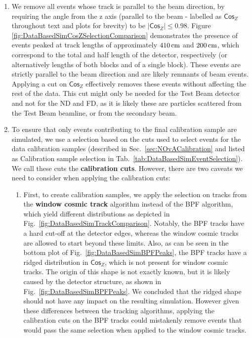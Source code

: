 \begin{enumerate}
\item We remove all events whose track is parallel to the beam direction, by requiring the angle from the z axis (parallel to the beam - labelled as $\textsf{Cos}_Z$ throughout text and plots for brevity) to be $|\textsf{Cos}_Z|\leq 0.98$. Figure \ref{fig:DataBasedSimCosZSelectionComparison} demonstrates the presence of events peaked at track lengths of approximately $\unit[410]{cm}$ and $\unit[200]{cm}$, which correspond to the total and half length of the detector, respectively (or alternatively lengths of both blocks and of a single block). These events are strictly parallel to the beam direction and are likely remnants of beam events. Applying a cut on $\textsf{Cos}_Z$ effectively removes these events without affecting the rest of the data. This cut might only be needed for the Test Beam detector and not for the \gls{ND} and \gls{FD}, as it is likely these are particles scattered from the Test Beam beamline, or from the secondary beam.

\item To ensure that only events contributing to the final calibration sample are simulated, we use a selection based on the cuts used to select events for the data calibration samples (described in Sec.~\ref{sec:NOvACalibration} and listed as Calibration sample selection in Tab.~\ref{tab:DataBasedSimEventSelection}). We call these cuts the \textbf{calibration cuts}. However, there are two caveats we need to consider when applying the calibration cuts:
\begin{enumerate}
\item First, to create calibration samples, we apply the selection on tracks from the \textbf{window cosmic track} algorithm instead of the \gls{BPF} algorithm, which yield different distributions as depicted in Fig.~\ref{fig:DataBasedSimTrackComparison}. Notably, the \gls{BPF} tracks have a hard cut-off at the detector edges, whereas the window cosmic tracks are allowed to start beyond these limits. Also, as can be seen in the bottom plot of Fig.~\ref{fig:DataBasedSimBPFPeaks}, the \gls{BPF} tracks have a ridged distribution in $\textsf{Cos}_Z$, which is not present for window cosmic tracks. The origin of this shape is not exactly known, but it is likely caused by the detector structure, as shown in Fig.~\ref{fig:DataBasedSimBPFPeaks}. We concluded that the ridged shape should not have any impact on the resulting simulation. However given these differences between the tracking algorithms, applying the calibration cuts on the \gls{BPF} tracks could mistakenly remove events that would pass the same selection when applied to the window cosmic tracks.


\end{enumerate}
\end{enumerate}

